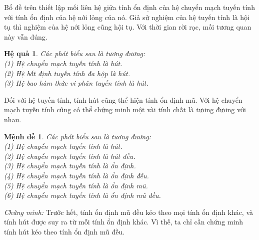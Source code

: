\documentclass[14pt,a4paper,oneside]{report}		%
\newtheorem{proposition}[theorem]{Mệnh đề}
\newtheorem{corollary}[theorem]{Hệ quả}
\theoremstyle{definition}
\begin{document}
Bổ đề trên thiết lập mối liên hệ giữa tính ổn định của hệ chuyển mạch tuyến tính với tính ổn định của hệ nới lỏng của nó. Giả sử nghiệm của hệ tuyến tính là hội tụ thì nghiệm của hệ nới lỏng cũng hội tụ. Với thời gian rời rạc, mối tương quan này vẫn đúng.

\begin{corollary} \label{co2-12}
Các phát biểu sau là tương đương:\\
(1) Hệ chuyển mạch tuyến tính là hút.\\
(2) Hệ bất định tuyến tính đa hộp là hút.\\
(3) Hệ bao hàm thức vi phân tuyến tính là hút.
\end{corollary}

Đối với hệ tuyến tính, tính hút cũng thể hiện tính ổn định mũ. Với hệ chuyển mạch tuyến tính cũng có thể chứng minh một vài tính chất là tương đương với nhau.

\begin{proposition} \label{pro2-13}
Các phát biểu sau là tương đương:\\
(1) Hệ chuyển mạch tuyến tính là hút.\\
(2) Hệ chuyển mạch tuyến tính là hút đều.\\
(3) Hệ chuyển mạch tuyến tính là ổn định.\\
(4) Hệ chuyển mạch tuyến tính là ổn định đều.\\
(5) Hệ chuyển mạch tuyến tính là ổn định mũ.\\
(6) Hệ chuyển mạch tuyến tính là ổn định mũ đều.
\end{proposition}

\textit{Chứng minh:} Trước hết, tính ổn định mũ đều kéo theo mọi tính ổn định khác, và tính hút được suy ra từ mỗi tính ổn định khác. Vì thế, ta chỉ cần chứng minh tính hút kéo theo tính ổn định mũ đều.\\
\end{document}
